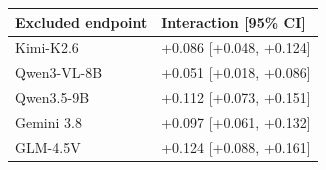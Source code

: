\begin{tabular}{ll}
\toprule
Excluded endpoint & Interaction [95\% CI] \\
\midrule
Kimi-K2.6 & +0.086 [+0.048, +0.124] \\
Qwen3-VL-8B & +0.051 [+0.018, +0.086] \\
Qwen3.5-9B & +0.112 [+0.073, +0.151] \\
Gemini 3.8 & +0.097 [+0.061, +0.132] \\
GLM-4.5V & +0.124 [+0.088, +0.161] \\
\bottomrule
\end{tabular}
